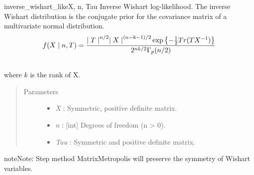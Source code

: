 \hypertarget{pymc.distributions.inverse_wishart_like}{}\begin{funcdesc}{inverse\_wishart\_like}{X, n, Tau}
Inverse Wishart log-likelihood. The inverse Wishart distribution is the conjugate
prior for the covariance matrix of a multivariate normal distribution.
\begin{gather}
\begin{split}f(X \mid n, T) = \frac{{\mid T \mid}^{n/2}{\mid X \mid}^{(n-k-1)/2} \exp\left\{ -\frac{1}{2} Tr(TX^{-1}) \right\}}{2^{nk/2} \Gamma_p(n/2)}\end{split}\notag\\\begin{split}\end{split}\notag
\end{gather}
where $k$ is the rank of X.
\begin{quote}\begin{description}
\item[Parameters] \leavevmode\begin{itemize}
\item {} 
\emph{X} : Symmetric, positive definite matrix.

\item {} 
\emph{n} : {[}int{]} Degrees of freedom (n \textgreater{} 0).

\item {} 
\emph{Tau} : Symmetric and positive definite matrix.

\end{itemize}

\end{description}\end{quote}

\begin{notice}{note}{Note:}
Step method MatrixMetropolis will preserve the symmetry of Wishart variables.
\end{notice}
\end{funcdesc}


